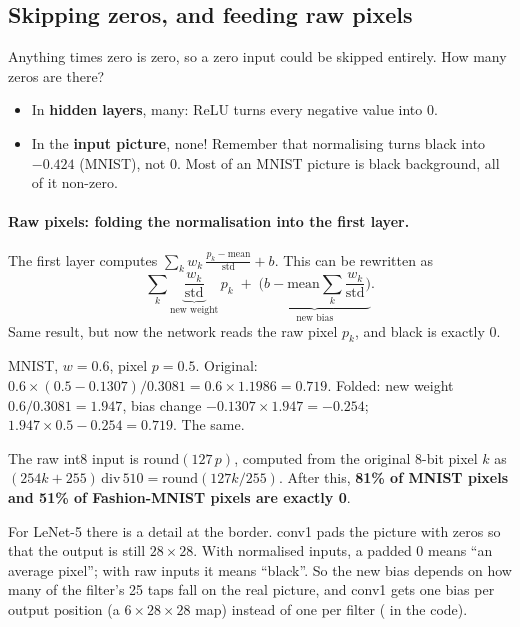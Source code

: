 \subsection{Skipping zeros, and feeding raw pixels}\label{sec:zeroskip}

Anything times zero is zero, so a zero input could be skipped entirely. How many zeros are there?
\begin{itemize}
  \item In \textbf{hidden layers}, many: ReLU turns every negative value into 0.
  \item In the \textbf{input picture}, none! Remember that normalising turns black into $-0.424$ (MNIST),
        not 0. Most of an MNIST picture is black background, all of it non-zero.
\end{itemize}

\paragraph{Raw pixels: folding the normalisation into the first layer.} The first layer computes
$\sum_k w_k\,\frac{p_k - \text{mean}}{\text{std}} + b$. This can be rewritten as
\[
  \sum_k \underbrace{\frac{w_k}{\text{std}}}_{\text{new weight}}\, p_k
  \;+\; \underbrace{\Big(b - \text{mean}\sum_k \frac{w_k}{\text{std}}\Big)}_{\text{new bias}}.
\]
Same result, but now the network reads the raw pixel $p_k$, and black is exactly 0.
\begin{example}
MNIST, $w = 0.6$, pixel $p = 0.5$. Original: $0.6\times(0.5-0.1307)/0.3081 = 0.6\times1.1986 = 0.719$.
Folded: new weight $0.6/0.3081 = 1.947$, bias change $-0.1307\times1.947 = -0.254$;
$1.947\times0.5 - 0.254 = 0.719$. The same.
\end{example}
The raw int8 input is $\text{round}(127\,p)$, computed from the original 8-bit pixel $k$ as
$(254k + 255)\,\text{div}\,510 = \text{round}(127k/255)$. After this, \textbf{81\% of MNIST pixels and 51\%
of Fashion-MNIST pixels are exactly 0}.

\begin{careful}
For LeNet-5 there is a detail at the border. conv1 pads the picture with zeros so that the output is still
$28\times28$. With normalised inputs, a padded 0 means ``an average pixel''; with raw inputs it means
``black''. So the new bias depends on how many of the filter's 25 taps fall on the real picture, and conv1
gets one bias per output position (a $6\times28\times28$ map) instead of one per filter
( in the code).
\end{careful}

